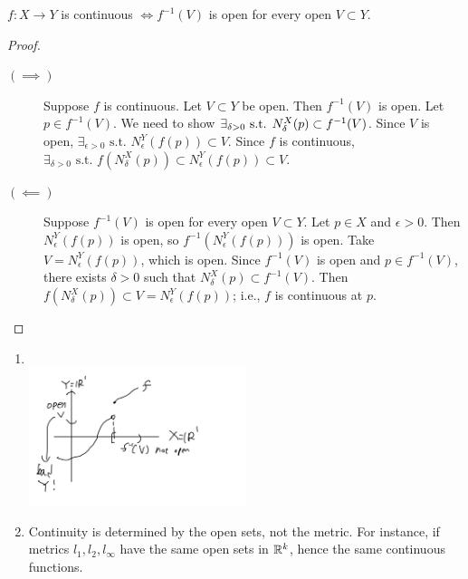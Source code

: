 \begin{theorem}
	$f: X\to Y$ is continuous $\Leftrightarrow  f^{-1}(V)$ is open for every open $V \subset Y$.
	\begin{proof}
		\begin{description}
			\item[$(\implies)$]
			      Suppose $f$ is continuous. Let $V \subset Y$ be open. Then $f^{-1}(V)$ is open.
			      Let $p \in f^{-1}(V)$. We need to show {$\exists_{\delta >0} \text{ s.t. } \linebreak N_{\delta}^{X}(p) \subset f^{-1}(V)$.} Since $V$ is open, $\exists_{\epsilon > 0} \text{ s.t. } N_{\epsilon}^{Y}(f(p)) \subset V$.
			      Since $f$ is continuous, $\exists_{\delta > 0} \text{ s.t. } f(N_{\delta}^{X}(p)) \subset N_{\epsilon}^{Y}(f(p)) \subset V$.
			\item[$(\impliedby)$]
			      Suppose $f^{-1}(V)$ is open for every open $V \subset Y$. Let $p \in X$ and $\epsilon>0$. Then $N_{\epsilon}^{Y}(f(p))$ is open, so $f^{-1}(N_{\epsilon}^{Y}(f(p)))$ is open. Take $V=N_{\epsilon}^{Y}(f(p))$, which is open.
			      Since $f^{-1}(V)$ is open and $p \in f^{-1}(V)$, there exists $\delta>0$ such that $N_{\delta}^{X}(p) \subset f^{-1}(V)$. Then $f(N_{\delta}^{X}(p)) \subset V=N_{\epsilon}^{Y}(f(p))$; i.e., $f$ is continuous at $p$.
		\end{description}
	\end{proof}
	\begin{remark}\hfill
		\begin{enumerate}
			\item
			      \hfill\\
			      \includegraphics[width=0.5\textwidth]{./figs/thm4-8-a.jpeg}
			\item Continuity is determined by the open sets, not the metric. For instance, if metrics $l_1,l_2,l_{\infty}$ have the same open sets in $\mathbb{R}^{k}$, hence the same continuous functions.

\end{enumerate}
\end{remark}
\end{theorem}
